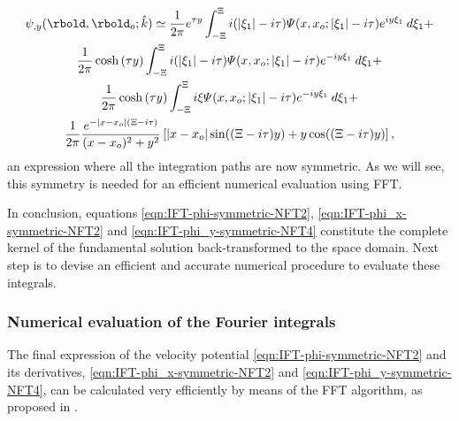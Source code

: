 \begin{multline}
\label{eqn:IFT-phi_y-symmetric-NFT4}
\psi_{,y}(\rbold,\rbold_{o}; \hat{k}) \simeq 
\dfrac{1}{2\pi} e^{\tau y}\int_{-\Xi}^{\Xi} 
i (\vert \xi_{1} \vert -i\tau) \varPsi (x,x_o;|\xi_{1}|-i\tau) e^{i y \xi_{1}} \:d\xi_{1} + 
\\
\dfrac{1}{2\pi} \cosh{(\tau y)} \int_{-\Xi}^{\Xi} i(\vert \xi_{1} \vert -i\tau) \varPsi (x,x_o; \vert \xi_{1} \vert -i\tau) e^{-i y \xi_{1}} \:d\xi_{1} +
\\
\dfrac{1}{2\pi} \cosh{(\tau y)} \int_{-\Xi}^{\Xi} i\xi \varPsi (x,x_o;\vert \xi_{1} \vert -i\tau) e^{-i y \xi_{1}} \:d\xi_{1} +
\\
\dfrac{1}{2\pi} \dfrac{e^{-| x-x_o | (\Xi-i \tau)}}{(x-x_o)^{2}+y^{2}} \left[| x-x_o| \sin((\Xi-i\tau)y) +y \cos((\Xi-i\tau)y) \right],
\end{multline}
an expression where all the integration paths are now symmetric. As we will see, this symmetry is needed for an efficient numerical evaluation using FFT.

In conclusion, equations \eqref{eqn:IFT-phi-symmetric-NFT2}, \eqref{eqn:IFT-phi_x-symmetric-NFT2} and \eqref{eqn:IFT-phi_y-symmetric-NFT4} constitute the complete kernel of the fundamental solution back-transformed to the space domain. Next step is to devise an efficient and accurate numerical procedure to evaluate these integrals.

\subsubsection{Numerical evaluation of the Fourier integrals}
The final expression of the velocity potential \eqref{eqn:IFT-phi-symmetric-NFT2} and its derivatives, \eqref{eqn:IFT-phi_x-symmetric-NFT2} and \eqref{eqn:IFT-phi_y-symmetric-NFT4}, can be calculated very efficiently by means of the FFT algorithm, as proposed in \cite{Belibassakis2000}.


